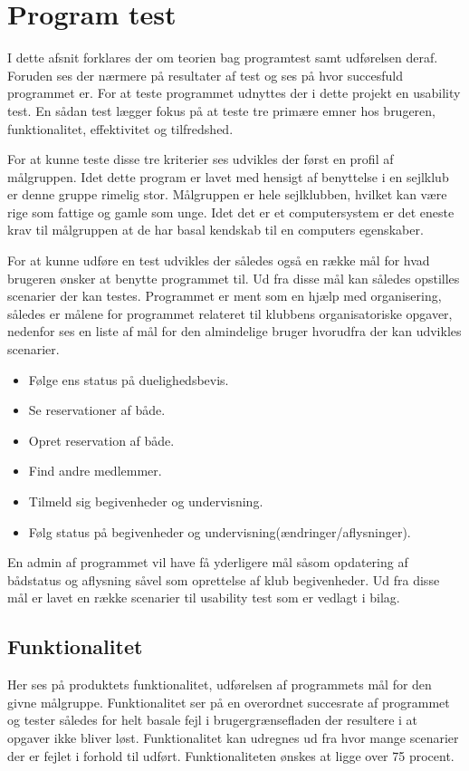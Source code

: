 \chapter{Program test}
I dette afsnit forklares der om teorien bag programtest samt udførelsen deraf. Foruden ses der nærmere på resultater af test og ses på hvor succesfuld programmet er. For at teste programmet udnyttes der i dette projekt en usability test. En sådan test lægger fokus på at teste tre primære emner hos brugeren, funktionalitet, effektivitet og tilfredshed. 

For at kunne teste disse tre kriterier ses udvikles der først en profil af målgruppen. Idet dette program er lavet med hensigt af benyttelse i en sejlklub er denne gruppe rimelig stor. Målgruppen er hele sejlklubben, hvilket kan være rige som fattige og gamle som unge. Idet det er et computersystem er det eneste krav til målgruppen at de har basal kendskab til en computers egenskaber.

For at kunne udføre en test udvikles der således også en række mål for hvad brugeren ønsker at benytte programmet til. Ud fra disse mål kan således opstilles scenarier der kan testes. Programmet er ment som en hjælp med organisering, således er målene for programmet relateret til klubbens organisatoriske opgaver, nedenfor ses en liste af mål for den almindelige bruger hvorudfra der kan udvikles scenarier.
\begin{itemize}
  \item Følge ens status på duelighedsbevis.
  \item Se reservationer af både.
  \item Opret reservation af  både.
  \item Find andre medlemmer.
  \item Tilmeld sig begivenheder og undervisning.
  \item Følg status på begivenheder og undervisning(ændringer/aflysninger).
\end{itemize}
En admin af programmet vil have få yderligere mål såsom opdatering af bådstatus og aflysning såvel som oprettelse af klub begivenheder. Ud fra disse mål er lavet en række scenarier til usability test som er vedlagt i bilag. 
\section{Funktionalitet}
Her ses på produktets funktionalitet, udførelsen af programmets mål for den givne målgruppe. Funktionalitet ser på en overordnet succesrate af programmet og tester således for helt basale fejl i brugergrænsefladen der resultere i at opgaver ikke bliver løst. Funktionalitet kan udregnes ud fra hvor mange scenarier der er fejlet i forhold til udført. Funktionaliteten ønskes at ligge over 75 procent. 
